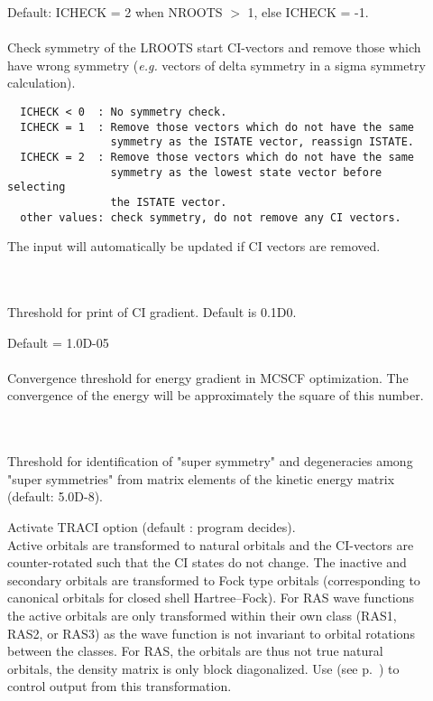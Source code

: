 \begin{description}
\item[]
  Default: ICHECK = 2 when NROOTS $>$ 1, else ICHECK = -1.\\
   \\
  Check symmetry of the LROOTS start CI-vectors and remove those which
  have wrong symmetry ({\it e.g.\/} vectors of delta symmetry in a sigma
  symmetry calculation).
\begin{verbatim}
  ICHECK < 0  : No symmetry check.
  ICHECK = 1  : Remove those vectors which do not have the same
                symmetry as the ISTATE vector, reassign ISTATE.
  ICHECK = 2  : Remove those vectors which do not have the same
                symmetry as the lowest state vector before selecting
                the ISTATE vector.
  other values: check symmetry, do not remove any CI vectors.
\end{verbatim}
  The  input will automatically be
  updated if CI vectors are removed.

\item[] \ \\
   \\
  Threshold for print of CI gradient. Default is 0.1D0.

\item[]
  Default = 1.0D-05\\
   \\
  Convergence threshold for energy gradient in MCSCF optimization.
  The convergence of the energy will be approximately the square of this
  number.

\item[] \ \\
   \\
  Threshold for identification of "super
  symmetry" and degeneracies among
  "super symmetries" from matrix elements of the kinetic energy matrix
  (default: 5.0D-8).

\item[]
  Activate TRACI option (default : program decides).\\
  Active orbitals are transformed to natural orbitals and the CI-vectors
  are counter-rotated such that the CI states do not change.  The
  inactive and secondary orbitals are transformed to Fock type orbitals
  (corresponding to canonical orbitals for closed shell Hartree--Fock).
  For RAS wave functions the active orbitals are only transformed
  within their own class (RAS1, RAS2, or RAS3) as the wave function is
  not invariant to orbital rotations between the classes.  For RAS, the
  orbitals are thus not true natural orbitals, the density matrix is
  only block diagonalized.  Use  (see
  p.~\pageref{ref-priinp})   to control output from this
  transformation.

\end{description}


